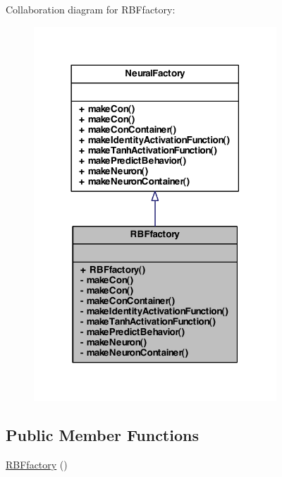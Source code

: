 Collaboration diagram for RBFfactory:
\nopagebreak
\begin{figure}[H]
\begin{center}
\leavevmode
\includegraphics[width=258pt]{class_r_b_ffactory__coll__graph}
\end{center}
\end{figure}
\subsection*{Public Member Functions}
\begin{DoxyCompactItemize}
\item 
\hyperlink{class_r_b_ffactory_af6d7b55c1c157b296f211c46f253f546}{RBFfactory} ()
\end{DoxyCompactItemize}
